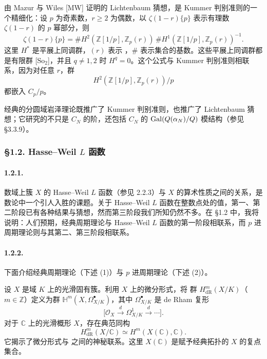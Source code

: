 由 Mazur 与 Wiles [MW] 证明的 Lichtenbaum 猜想，是 Kummer 判别准则的一个精细化：设 $p$ 为奇素数，$r\geq2$ 为偶数，以 $\zeta(1-r)\{p\}$ 表示有理数 $\zeta(1-r)$ 的 $p$ 幂部分，则
\[
\zeta(1-r)\{p\}
=\#H^2(\mathbb Z[1/p],\mathbb Z_p(r))\,
 \#H^1(\mathbb Z[1/p],\mathbb Z_p(r))^{-1}.
\]
这里 $H^*$ 是平展上同调群，$(r)$ 表示 ，$\#$ 表示集合的基数。这些平展上同调群都是有限群 [So$_2$]，并且 $q\ne1,2$ 时 $H^q=0$。这个公式与 Kummer 判别准则相联系，因为对任意 $r$，群
\[
H^2(\mathbb Z[1/p],\mathbb Z_p(r))/p
\]
都嵌入 $C_p/p$。

经典的分圆域岩泽理论既推广了 Kummer 判别准则，也推广了 Lichtenbaum 猜想；它研究的不只是 $C_N$ 的阶，还包括 $C_N$ 的 $\operatorname{Gal}(Q(\alpha_N)/Q)$ 模结构（参见 §3.3.9）。

\subsubsection*{§1.2. Hasse--Weil $L$ 函数}
\paragraph{1.2.1.}
数域上簇 $X$ 的 Hasse--Weil $L$ 函数（参见 2.2.3）与 $X$ 的算术性质之间的关系，是数论中一个引人入胜的课题。关于 Hasse--Weil $L$ 函数在整数点处的值，第一、第二阶段已有各种结果与猜想，然而第三阶段我们所知仍然不多。在 §1.2 中，我将说明：人们预期，经典周期理论与 Hasse--Weil $L$ 函数的第一阶段相联系，而 $p$ 进周期理论则与其第二、第三阶段相联系。

\paragraph{1.2.2.}
下面介绍经典周期理论（下述 (1)）与 $p$ 进周期理论（下述 (2)）。

设 $X$ 是域 $K$ 上的光滑固有簇。利用 $X$ 上的微分形式，将 群 $H^m_{\mathrm{dR}}(X/K)$（$m\in\mathbb Z$）定义为群 $\mathbb H^m(X,\Omega^\bullet_{X/K})$，其中 $\Omega^\bullet_{X/K}$ 是 de Rham 复形
\[
\bigl[\mathcal O_X\xrightarrow{d}\Omega^1_{X/K}\xrightarrow{d}\cdots\bigr].
\]
对于 $\mathbb C$ 上的光滑概形 $X$，存在典范同构
\[
H^m_{\mathrm{dR}}(X/\mathbb C)\simeq H^m(X(\mathbb C),\mathbb C).\tag{1}
\]
它揭示了微分形式与 之间的神秘联系。这里 $X(\mathbb C)$ 是赋予经典拓扑的 $X$ 的复点集合。

